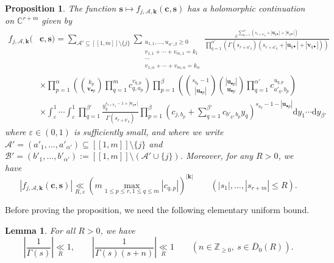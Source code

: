\documentclass[a4paper]{amsart}
\newtheorem{proposition}[theorem]{Proposition}
\newtheorem{lemma}[theorem]{Lemma}
\theoremstyle{remark}
\theoremstyle{definition}
\newcommand{\dd}{\mathrm{d}}
\begin{document}
\begin{proposition}
\label{prop:expression_f_Ajepsilon_s}
The function $\mathbf{s} \mapsto f_{j,\mathcal{A},\mathbf{k}}(\mathbf{c},\mathbf{s})$ has a holomorphic continuation on $\mathbb{C}^{r+m}$ given by
\begin{align}
    f_{j,\mathcal{A},\mathbf{k}}(&\mathbf{c},\mathbf{s}) = \sum_{\mathcal{A}' \subseteq [\![ 1,m ]\!] \setminus \{ j \}} \sum_{\substack{ u_{1,1},\ldots,u_{\alpha',\beta} \geq 0 \\ v_{1,1}+\cdots+v_{m,1}=k_1 \\ \cdots \\ v_{1,\alpha}+\cdots+v_{m,\alpha}=k_{\alpha}}} \frac{\varepsilon^{ \sum_{q=1}^{\alpha'} \left(s_{r+a'_q}+|\mathbf{u}_{q \bullet}| + |\mathbf{v}_{q \bullet}|\right)}}{\prod_{q=1}^{\alpha'} \left( \Gamma(s_{r+a'_q})(s_{r+a'_q}+ |\mathbf{u}_{q \bullet}| + |\mathbf{v}_{q \bullet}|)\right)} \nonumber \\
    & \times \prod_{p=1}^{\alpha} \left(\binom{k_p}{\mathbf{v}_{\bullet p}} \prod_{q=1}^m c_{q,a_p}^{v_{q,p}} \right) \prod_{p=1}^{\beta} \left( \binom{s_{b_p}-1}{|\mathbf{u}_{\bullet p}|} \binom{|\mathbf{u}_{\bullet p}|}{\mathbf{u}_{\bullet p}} \prod_{q=1}^{\alpha'} c_{a'_q,b_p}^{u_{q,p}} \right) \label{eq:expression_f_Ajepsilon_s} \\
    & \times \int_{\varepsilon}^{1} \cdots \int_{\varepsilon}^1 \prod_{q=1}^{\beta'} \frac{y_q^{s_{r+b'_q}-1+|\mathbf{v}_{q \bullet}|}}{\Gamma(s_{r+b'_q})} \prod_{p=1}^{\beta} \left( c_{j,b_p}+\sum_{q=1}^{\beta'} c_{b'_q,b_p} y_{q} \right)^{s_{a_p}-1-|\mathbf{u}_{\bullet p}|} \dd y_1 \cdots \dd y_{\beta'} \nonumber
\end{align}
where $\varepsilon \in (0,1)$ is sufficiently small, and where we write $\mathcal{A}'=(a'_1,\ldots,a'_{\alpha'}) \subseteq [\![ 1,m ]\!] \setminus \{ j \}$ and $\mathcal{B}'=(b'_1,\ldots,b'_{\alpha'}) := [\![ 1,m ]\!] \setminus ( \mathcal{A}' \cup \{ j \})$. Moreover, for any $R>0$, we have
\begin{equation}
    |f_{j,\mathcal{A},\mathbf{k}}(\mathbf{c},\mathbf{s})| \underset{R,\varepsilon}{\ll} (m \max_{1 \leq p \leq r, 1 \leq q \leq m}|c_{q,p}|)^{|\mathbf{k}|} \qquad (|s_1|,\ldots,|s_{r+m}| \leq R). \label{eq:bound_f_Ajk}
\end{equation}
\end{proposition}

Before proving the proposition, we need the following elementary uniform bound.

\begin{lemma}
\label{lem:bound_1_over_gamma}
For all $R>0$, we have
$$ \left| \frac{1}{\Gamma(s)} \right| \underset{R}{\ll} 1, \qquad \left| \frac{1}{\Gamma(s)(s+n)} \right| \underset{R}{\ll} 1 \qquad (n \in \mathbb{Z}_{\geq 0}, \ s \in \overline{D}_0(R)). $$
\end{lemma}
\end{document}
